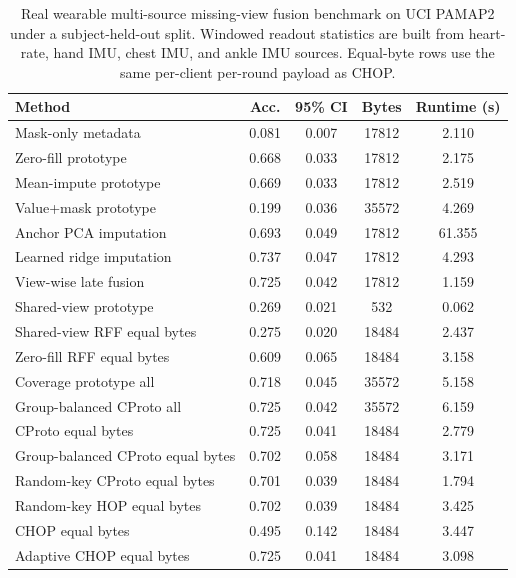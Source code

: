 ﻿\begin{table}[t]
\centering
\caption{Real wearable multi-source missing-view fusion benchmark on UCI PAMAP2 under a subject-held-out split. Windowed readout statistics are built from heart-rate, hand IMU, chest IMU, and ankle IMU sources. Equal-byte rows use the same per-client per-round payload as CHOP.}
\label{tab:if-pamap2-fusion}
\scriptsize
\setlength{\tabcolsep}{3pt}
\renewcommand{\arraystretch}{0.94}
\begin{tabular}{lcccc}
\toprule
Method & Acc. & 95\% CI & Bytes & Runtime (s) \\
\midrule
Mask-only metadata & 0.081 & 0.007 & 17812 & 2.110 \\
Zero-fill prototype & 0.668 & 0.033 & 17812 & 2.175 \\
Mean-impute prototype & 0.669 & 0.033 & 17812 & 2.519 \\
Value+mask prototype & 0.199 & 0.036 & 35572 & 4.269 \\
Anchor PCA imputation & 0.693 & 0.049 & 17812 & 61.355 \\
Learned ridge imputation & 0.737 & 0.047 & 17812 & 4.293 \\
View-wise late fusion & 0.725 & 0.042 & 17812 & 1.159 \\
Shared-view prototype & 0.269 & 0.021 & 532 & 0.062 \\
Shared-view RFF equal bytes & 0.275 & 0.020 & 18484 & 2.437 \\
Zero-fill RFF equal bytes & 0.609 & 0.065 & 18484 & 3.158 \\
Coverage prototype all & 0.718 & 0.045 & 35572 & 5.158 \\
Group-balanced CProto all & 0.725 & 0.042 & 35572 & 6.159 \\
CProto equal bytes & 0.725 & 0.041 & 18484 & 2.779 \\
Group-balanced CProto equal bytes & 0.702 & 0.058 & 18484 & 3.171 \\
Random-key CProto equal bytes & 0.701 & 0.039 & 18484 & 1.794 \\
Random-key HOP equal bytes & 0.702 & 0.039 & 18484 & 3.425 \\
CHOP equal bytes & 0.495 & 0.142 & 18484 & 3.447 \\
Adaptive CHOP equal bytes & 0.725 & 0.041 & 18484 & 3.098 \\
\bottomrule
\end{tabular}
\end{table}


